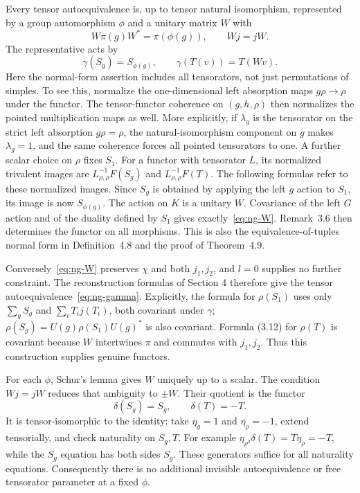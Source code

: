 Every tensor autoequivalence is, up to tensor natural isomorphism,
represented by a group automorphism $\phi$ and a unitary matrix $W$ with
\begin{equation}\label{eq:ng-W}
 W\pi(g)W^*=\pi(\phi(g)),\qquad Wj=jW.
\end{equation}
The representative acts by
\begin{equation}\label{eq:ng-gamma}
 \gamma(S_g)=S_{\phi(g)},\qquad
 \gamma(T(v))=T(Wv).
\end{equation}
Here the normal-form assertion includes all tensorators, not just
permutations of simples. To see this, normalize the one-dimensional left
absorption maps $g\rho\to\rho$ under the functor. The tensor-functor
coherence on $(g,h,\rho)$ then normalizes the pointed multiplication
maps as well. More explicitly, if $\lambda_g$ is the tensorator on the
strict left absorption $g\rho=\rho$, the natural-isomorphism component
on $g$ makes $\lambda_g=1$, and the same coherence forces all pointed
tensorators to one. A further scalar choice on $\rho$ fixes $S_1$.
For a functor with tensorator $L$, its normalized trivalent images are
$L_{\rho,\rho}^{-1}F(S_g)$ and $L_{\rho,\rho}^{-1}F(T)$.
The following formulas refer to these normalized images.
Since $S_g$ is obtained by applying the left $g$ action to $S_1$,
its image is now $S_{\phi(g)}$. The action on $K$ is a unitary $W$.
Covariance of the left $G$ action and of the duality defined by $S_1$
gives exactly~\eqref{eq:ng-W}. Remark~3.6 then determines the functor on
all morphisms. This is also the equivalence-of-tuples normal form in
Definition~4.8 and the proof of Theorem~4.9.

Conversely~\eqref{eq:ng-W} preserves $\chi$ and both $j_1,j_2$, and
$l=0$ supplies no further constraint. The reconstruction formulas of
Section 4 therefore give the tensor autoequivalence~\eqref{eq:ng-gamma}.
Explicitly, the formula for $\rho(S_1)$ uses only
$\sum_g S_g$ and $\sum_iT_i j(T_i)$, both covariant under $\gamma$;
$\rho(S_g)=U(g)\rho(S_1)U(g)^*$ is also covariant. Formula (3.12) for
$\rho(T)$ is covariant because $W$ intertwines $\pi$ and commutes with
$j_1,j_2$. Thus this construction supplies genuine functors.

For each $\phi$, Schur's lemma gives $W$ uniquely up to a scalar. The
condition $Wj=jW$ reduces that ambiguity to $\pm W$. Their quotient is
the functor
\[
\delta(S_g)=S_g,\qquad\delta(T)=-T.
\]
It is tensor-isomorphic to the identity: take $\eta_g=1$ and
$\eta_\rho=-1$, extend tensorially, and check naturality on $S_g,T$.
For example $\eta_{\rho^2}\delta(T)=T\eta_\rho=-T$, while the
$S_g$ equation has both sides $S_g$. These generators suffice for all
naturality equations. Consequently there is no additional invisible
autoequivalence or free tensorator parameter at a fixed $\phi$.

